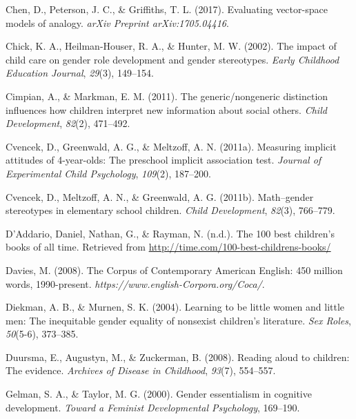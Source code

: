 \documentclass[english,,man,floatsintext]{apa6}
\begin{document}
\leavevmode\hypertarget{ref-chen2017evaluating}{}%
Chen, D., Peterson, J. C., \& Griffiths, T. L. (2017). Evaluating vector-space models of analogy. \emph{arXiv Preprint arXiv:1705.04416}.

\leavevmode\hypertarget{ref-chick2002impact}{}%
Chick, K. A., Heilman-Houser, R. A., \& Hunter, M. W. (2002). The impact of child care on gender role development and gender stereotypes. \emph{Early Childhood Education Journal}, \emph{29}(3), 149--154.

\leavevmode\hypertarget{ref-cimpian2011generic}{}%
Cimpian, A., \& Markman, E. M. (2011). The generic/nongeneric distinction influences how children interpret new information about social others. \emph{Child Development}, \emph{82}(2), 471--492.

\leavevmode\hypertarget{ref-cvencek2011measuring}{}%
Cvencek, D., Greenwald, A. G., \& Meltzoff, A. N. (2011a). Measuring implicit attitudes of 4-year-olds: The preschool implicit association test. \emph{Journal of Experimental Child Psychology}, \emph{109}(2), 187--200.

\leavevmode\hypertarget{ref-cvencek2011math}{}%
Cvencek, D., Meltzoff, A. N., \& Greenwald, A. G. (2011b). Math--gender stereotypes in elementary school children. \emph{Child Development}, \emph{82}(3), 766--779.

\leavevmode\hypertarget{ref-time_100_kidbooks}{}%
D'Addario, Daniel, Nathan, G., \& Rayman, N. (n.d.). The 100 best children's books of all time. Retrieved from \url{http://time.com/100-best-childrens-books/}

\leavevmode\hypertarget{ref-davies2008corpus}{}%
Davies, M. (2008). The Corpus of Contemporary American English: 450 million words, 1990-present. \emph{https://www.english-Corpora.org/Coca/}.

\leavevmode\hypertarget{ref-diekman2004learning}{}%
Diekman, A. B., \& Murnen, S. K. (2004). Learning to be little women and little men: The inequitable gender equality of nonsexist children's literature. \emph{Sex Roles}, \emph{50}(5-6), 373--385.

\leavevmode\hypertarget{ref-duursma2008reading}{}%
Duursma, E., Augustyn, M., \& Zuckerman, B. (2008). Reading aloud to children: The evidence. \emph{Archives of Disease in Childhood}, \emph{93}(7), 554--557.

\leavevmode\hypertarget{ref-gelman2000gender}{}%
Gelman, S. A., \& Taylor, M. G. (2000). Gender essentialism in cognitive development. \emph{Toward a Feminist Developmental Psychology}, 169--190.
\end{document}

